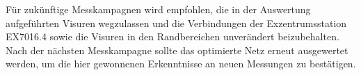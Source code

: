 Für zukünftige Messkampagnen wird empfohlen, die in der Auswertung aufgeführten Visuren wegzulassen und die
Verbindungen der Exzentrumsstation EX7016.4 sowie die Visuren in den Randbereichen unverändert beizubehalten.
Nach der nächsten Messkampagne sollte das optimierte Netz erneut ausgewertet werden, um die hier gewonnenen
Erkenntnisse an neuen Messungen zu bestätigen.
